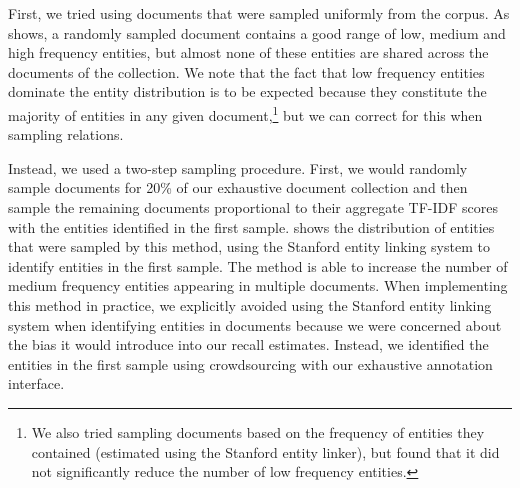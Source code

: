 First, we tried using documents that were sampled uniformly from the corpus.
As  shows, 
a randomly sampled document contains a good range of low, medium and high frequency entities, but almost none of these entities are shared across the documents of the collection.
We note that the fact that low frequency entities dominate the entity distribution is to be expected because they constitute the majority of entities in any given document,\footnote{%
  We also tried sampling documents based on the frequency of entities they contained (estimated using the Stanford entity linker), but found that it did not significantly reduce the number of low frequency entities.} but we can correct for this when sampling relations.

Instead, we used a two-step sampling procedure.
First, we would  randomly sample documents for 20\% of our exhaustive document collection and then sample the remaining documents proportional to their aggregate TF-IDF scores with the entities identified in the first sample.
 shows the distribution of entities that were sampled by this method, using the Stanford entity linking system to identify entities in the first sample.
The method is able to increase the number of medium frequency entities appearing in multiple documents.
When implementing this method in practice, we explicitly avoided using the Stanford entity linking system when identifying entities in documents because we were concerned about the bias it would introduce into our recall estimates.
Instead, we identified the entities in the first sample using crowdsourcing with our exhaustive annotation interface.

